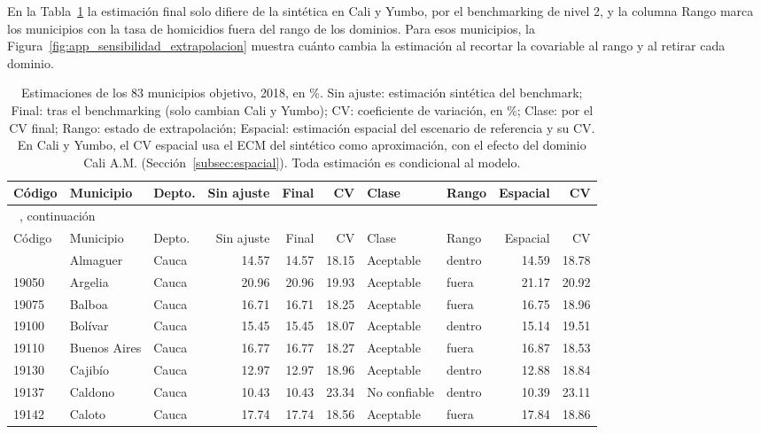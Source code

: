 En la Tabla~\ref{tab:app_municipios} la estimación final solo difiere de la sintética en Cali y Yumbo, por el benchmarking de nivel 2, y la columna Rango marca los municipios con la tasa de homicidios fuera del rango de los dominios. Para esos municipios, la Figura~\ref{fig:app_sensibilidad_extrapolacion} muestra cuánto cambia la estimación al recortar la covariable al rango y al retirar cada dominio.

{\scriptsize\setlength{\tabcolsep}{2pt}
\begin{longtable}{l p{3.0cm} l r r r l l r r}
\caption[Estimaciones de los 83 municipios objetivo]{Estimaciones de los 83 municipios objetivo, 2018, en \%. Sin ajuste: estimación sintética del benchmark; Final: tras el benchmarking (solo cambian Cali y Yumbo); CV: coeficiente de variación, en \%; Clase: por el CV final; Rango: estado de extrapolación; Espacial: estimación espacial del escenario de referencia y su CV. En Cali y Yumbo, el CV espacial usa el ECM del sintético como aproximación, con el efecto del dominio Cali A.M. (Sección~\ref{subsec:espacial}). Toda estimación es condicional al modelo.}
\label{tab:app_municipios} \\
\toprule
Código & Municipio & Depto. & Sin ajuste & Final & CV & Clase & Rango & Espacial & CV \\
\midrule
\endfirsthead
\multicolumn{10}{l}{\tablename~\thetable{}, continuación} \\
\toprule
Código & Municipio & Depto. & Sin ajuste & Final & CV & Clase & Rango & Espacial & CV \\
\midrule
\endhead
\bottomrule
\endlastfoot
19022 & Almaguer & Cauca & 14.57 & 14.57 & 18.15 & Aceptable & dentro & 14.59 & 18.78 \\
19050 & Argelia & Cauca & 20.96 & 20.96 & 19.93 & Aceptable & fuera & 21.17 & 20.92 \\
19075 & Balboa & Cauca & 16.71 & 16.71 & 18.25 & Aceptable & fuera & 16.75 & 18.96 \\
19100 & Bolívar & Cauca & 15.45 & 15.45 & 18.07 & Aceptable & dentro & 15.14 & 19.51 \\
19110 & Buenos Aires & Cauca & 16.77 & 16.77 & 18.27 & Aceptable & fuera & 16.87 & 18.53 \\
19130 & Cajibío & Cauca & 12.97 & 12.97 & 18.96 & Aceptable & dentro & 12.88 & 18.84 \\
19137 & Caldono & Cauca & 10.43 & 10.43 & 23.34 & No confiable & dentro & 10.39 & 23.11 \\
19142 & Caloto & Cauca & 17.74 & 17.74 & 18.56 & Aceptable & fuera & 17.84 & 18.86 \\

\end{longtable}}
